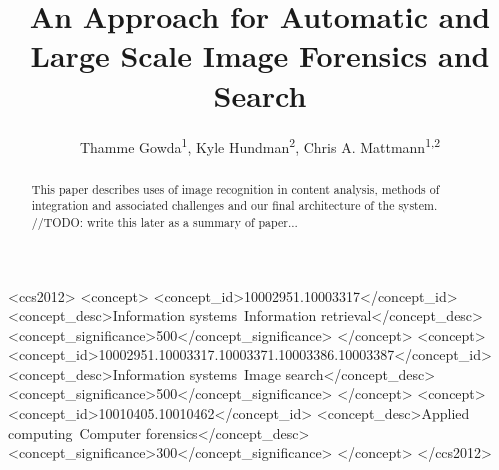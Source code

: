 \documentclass[sigconf]{acmart}
\begin{document}
\title[Automatic Large Scale Image Forensics]{An Approach for Automatic and Large Scale Image Forensics and Search}
\author{Thamme Gowda\textsuperscript{1}, Kyle Hundman\textsuperscript{2}, Chris A. Mattmann\textsuperscript{1,2}}

\renewcommand{\shortauthors}{T. Gowda, K. Hundman, C. Mattmann}





\begin{abstract}
This paper describes uses of image recognition in content analysis, methods of integration and associated challenges and our final architecture of the system. //TODO: write this later as a summary of paper...
\end{abstract}

%
%
\begin{CCSXML}
<ccs2012>
<concept>
<concept_id>10002951.10003317</concept_id>
<concept_desc>Information systems~Information retrieval</concept_desc>
<concept_significance>500</concept_significance>
</concept>
<concept>
<concept_id>10002951.10003317.10003371.10003386.10003387</concept_id>
<concept_desc>Information systems~Image search</concept_desc>
<concept_significance>500</concept_significance>
</concept>
<concept>
<concept_id>10010405.10010462</concept_id>
<concept_desc>Applied computing~Computer forensics</concept_desc>
<concept_significance>300</concept_significance>
</concept>
</ccs2012>
\end{CCSXML}

\end{document}
